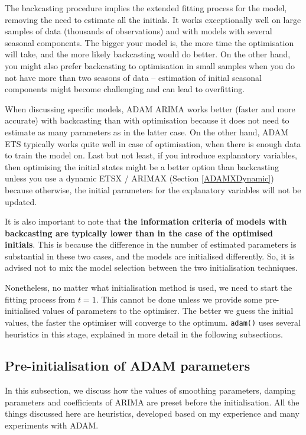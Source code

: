 \documentclass[]{book}
\theoremstyle{definition}
\theoremstyle{definition}
\theoremstyle{definition}
\theoremstyle{definition}
\theoremstyle{remark}
\begin{document}
The backcasting procedure implies the extended fitting process for the model, removing the need to estimate all the initials. It works exceptionally well on large samples of data (thousands of observations) and with models with several seasonal components. The bigger your model is, the more time the optimisation will take, and the more likely backcasting would do better. On the other hand, you might also prefer backcasting to optimisation in small samples when you do not have more than two seasons of data -- estimation of initial seasonal components might become challenging and can lead to overfitting.

When discussing specific models, ADAM ARIMA works better (faster and more accurate) with backcasting than with optimisation because it does not need to estimate as many parameters as in the latter case. On the other hand, ADAM ETS typically works quite well in case of optimisation, when there is enough data to train the model on. Last but not least, if you introduce explanatory variables, then optimising the initial states might be a better option than backcasting unless you use a dynamic ETSX / ARIMAX (Section \ref{ADAMXDynamic}) because otherwise, the initial parameters for the explanatory variables will not be updated.

It is also important to note that \textbf{the information criteria of models with backcasting are typically lower than in the case of the optimised initials}. This is because the difference in the number of estimated parameters is substantial in these two cases, and the models are initialised differently. So, it is advised not to mix the model selection between the two initialisation techniques.

Nonetheless, no matter what initialisation method is used, we need to start the fitting process from \(t=1\). This cannot be done unless we provide some pre-initialised values of parameters to the optimiser. The better we guess the initial values, the faster the optimiser will converge to the optimum. \texttt{adam()} uses several heuristics in this stage, explained in more detail in the following subsections.

\hypertarget{pre-initialisation-of-adam-parameters}{%
\subsection{Pre-initialisation of ADAM parameters}\label{pre-initialisation-of-adam-parameters}}

In this subsection, we discuss how the values of smoothing parameters, damping parameters and coefficients of ARIMA are preset before the initialisation. All the things discussed here are heuristics, developed based on my experience and many experiments with ADAM.
\end{document}
